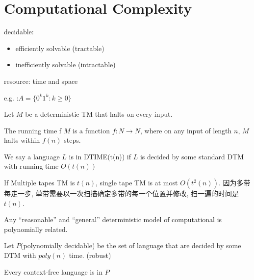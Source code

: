 \newpage
\section{Computational Complexity}

decidable:
\begin{itemize}
    \item efficiently solvable (tractable)
    \item inefficiently solvable (intractable)
\end{itemize}

resource: time and space

e.g. :$A=\{ 0^k1^k:k\ge 0 \}$

\begin{definition}
    Let $M$ be a deterministic TM that halts on every input. 
    
    The running time f $M$ is a function $f:N\to N$, where on any input of length $n$, $M$ halts within $f(n)$ steps. 
\end{definition}

\begin{definition}
    We say a language $L$ is in DTIME(t(n)) if $L$ is decided by some standard DTM with running time $O(t(n))$
\end{definition}

If Multiple tapes TM is $t(n)$, single tape TM is at most $O(t^2(n))$. 因为多带每走一步, 单带需要以一次扫描确定多带的每一个位置并修改, 扫一遍的时间是 $t(n)$. 

\begin{thesis}
    Any ``reasonable'' and ``general'' deterministic model of computational is polynomially related. 
\end{thesis}


\begin{definition}
    Let $P$(polynomially decidable) be the set of language that are decided by some DTM with $poly(n)$ time. (robust)
\end{definition}

\begin{theorem}
    Every context-free language is in $P$
\end{theorem}

